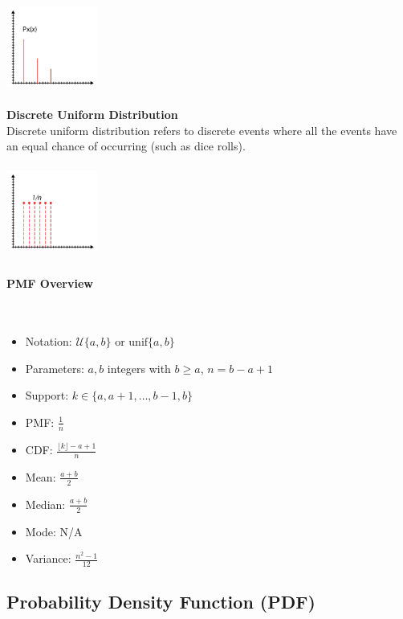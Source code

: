 \documentclass{article}
\begin{document}
\includegraphics[width=3cm, height=3cm]{pmf}

\textbf{Discrete Uniform Distribution} \\ 
Discrete uniform distribution refers to discrete events where all the events have an equal chance of occurring (such as dice rolls).

\includegraphics[width=3cm, height=3cm]{dud}

\paragraph{PMF Overview}\mbox{} \\

\begin{itemize}
    \item Notation: $\displaystyle {\mathcal{U}}\{a,b\}$ or $\displaystyle \text{unif} \{a,b\}$
    \item Parameters: $\displaystyle a,b$ integers with $\displaystyle b\geq a$, $\displaystyle n=b-a+1$
    \item Support: $\displaystyle k\in \{a,a+1,\dots ,b-1,b\}$
    \item PMF: $\displaystyle {\frac {1}{n}}$
    \item CDF: $\displaystyle {\frac {\lfloor k\rfloor -a+1}{n}}$ 
    \item Mean: $\displaystyle {\frac {a+b}{2}}$ 
    \item Median: $\displaystyle {\frac {a+b}{2}}$
    \item Mode:	N/A
    \item Variance: $\displaystyle {\frac {n^{2}-1}{12}}$
\end{itemize}

\subsection{Probability Density Function (PDF)}
\end{document}

